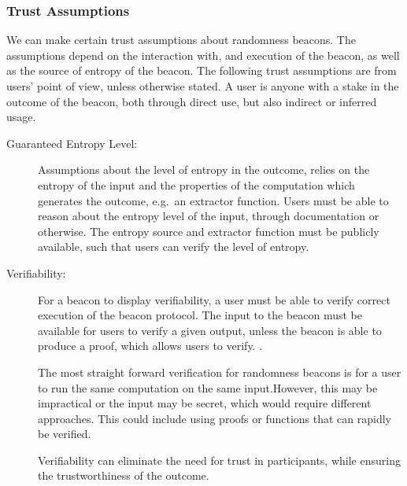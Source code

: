 \subsubsection{Trust Assumptions}\label{ssub:trust_assumptions}
We can make certain trust assumptions about randomness beacons.
The assumptions depend on the interaction with, and execution of the beacon, as well as the source of entropy of the beacon.
The following trust assumptions are from users' point of view, unless otherwise stated.
A user is anyone with a stake in the outcome of the beacon, both through direct use, but also indirect or inferred usage.
\begin{description}

    \item [Guaranteed Entropy Level:]
        Assumptions about the level of entropy in the outcome, relies on the entropy of the input and the properties of the computation which generates the outcome, e.g.\ an extractor function.
        Users must be able to reason about the entropy level of the input, through documentation or otherwise.
        The entropy source and extractor function must be publicly available, such that users can verify the level of entropy.

    \item [Verifiability:]
        For a beacon to display verifiability, a user must be able to verify correct execution of the beacon protocol.
        The input to the beacon must be available for users to verify a given output, unless the beacon is able to produce a proof, which allows users to verify. .

        The most straight forward verification for randomness beacons is for a user to run the same computation on the same input.However, this may be impractical or the input may be secret, which would require different approaches. This could include using proofs or functions that can rapidly be verified.


        Verifiability can eliminate the need for trust in participants, while ensuring the trustworthiness of the outcome.


\end{description}
